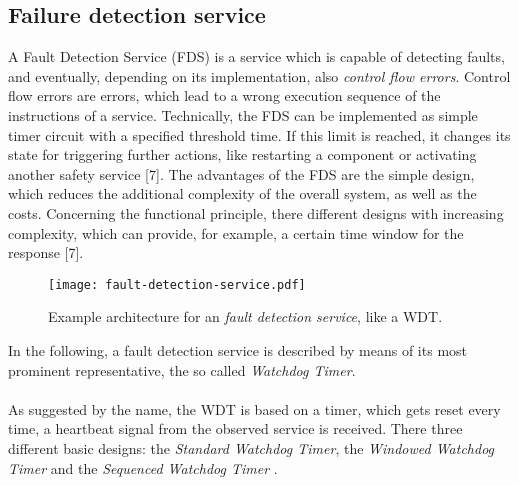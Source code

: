 \subsection{Failure detection service}

A Fault Detection Service (FDS) is a service which is capable of detecting faults, and eventually, depending on its implementation, also \emph{control flow errors}. Control flow errors are errors, which lead to a wrong execution sequence of the instructions of a service.
Technically, the FDS can be implemented as simple timer circuit with a specified threshold time. If this limit is reached, it changes its state for triggering further actions, like restarting a component or activating another safety service [7].
The advantages of the FDS are the simple design, which reduces the additional complexity of the overall system, as well as the costs. Concerning the functional principle, there different designs with increasing complexity, which can provide, for example, a certain time window for the response [7].


\begin{figure}[ht]
\centering
\texttt{[image: fault-detection-service.pdf]}
\caption{Example architecture for an \emph{fault detection service}, like a WDT.}
\label{fig:fault-detection-service}
\end{figure}

In the following, a fault detection service is described by means of its most prominent representative, the so called \emph{Watchdog Timer}.
\\
\\
As suggested by the name, the WDT is based on a timer, which gets reset every time, a heartbeat signal from the observed service is received. There three different basic designs: the \emph{Standard Watchdog Timer}, the \emph{Windowed Watchdog Timer} and the \emph{Sequenced Watchdog Timer} \cite{elattar2007}.


